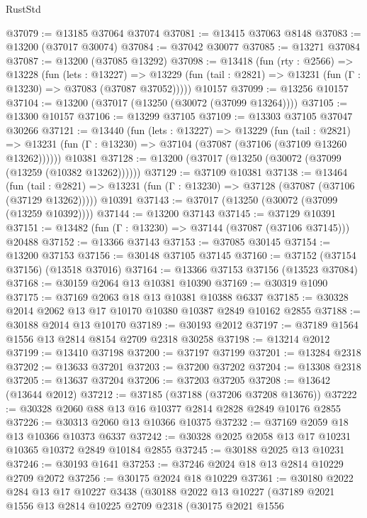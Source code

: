\begin{lexlean}{RustStd}
\begin{coremodule}
@37079 := @13185 @37064 @37074
@37081 := @13415 @37063 @8148
@37083 := @13200 (@37017 @30074)
@37084 := @37042 @30077
@37085 := @13271 @37084
@37087 := @13200 (@37085 @13292)
@37098 := @13418
    (fun (rty : @2566) =>
    @13228
      (fun (lets : @13227) =>
      @13229 (fun (tail : @2821) => @13231 (fun (Γ : @13230) => @37083 (@37087 @37052)))))
    @10157
@37099 := @13256 @10157
@37104 := @13200 (@37017 (@13250 (@30072 (@37099 @13264))))
@37105 := @13300 @10157
@37106 := @13299 @37105
@37109 := @13303 @37105 @37047 @30266
@37121 := @13440
    (fun (lets : @13227) =>
    @13229
      (fun (tail : @2821) =>
      @13231 (fun (Γ : @13230) => @37104 (@37087 (@37106 (@37109 @13260 @13262))))))
    @10381
@37128 := @13200 (@37017 (@13250 (@30072 (@37099 (@13259 (@10382 @13262))))))
@37129 := @37109 @10381
@37138 := @13464
    (fun (tail : @2821) => @13231 (fun (Γ : @13230) => @37128 (@37087 (@37106 (@37129 @13262)))))
    @10391
@37143 := @37017 (@13250 (@30072 (@37099 (@13259 @10392))))
@37144 := @13200 @37143
@37145 := @37129 @10391
@37151 := @13482 (fun (Γ : @13230) => @37144 (@37087 (@37106 @37145))) @20488
@37152 := @13366 @37143
@37153 := @37085 @30145
@37154 := @13200 @37153
@37156 := @30148 @37105 @37145
@37160 := @37152 (@37154 @37156) (@13518 @37016)
@37164 := @13366 @37153 @37156 (@13523 @37084)
@37168 := @30159 @2064 @13 @10381 @10390
@37169 := @30319 @1090
@37175 := @37169 @2063 @18 @13 @10381 @10388 @6337
@37185 := @30328 @2014 @2062 @13 @17 @10170 @10380 @10387 @2849 @10162 @2855
@37188 := @30188 @2014 @13 @10170
@37189 := @30193 @2012
@37197 := @37189 @1564 @1556 @13 @2814 @8154 @2709 @2318 @30258
@37198 := @13214 @2012
@37199 := @13410 @37198
@37200 := @37197 @37199
@37201 := @13284 @2318
@37202 := @13633 @37201
@37203 := @37200 @37202
@37204 := @13308 @2318
@37205 := @13637 @37204
@37206 := @37203 @37205
@37208 := @13642 (@13644 @2012)
@37212 := @37185 (@37188 (@37206 @37208 @13676))
@37222 := @30328 @2060 @88 @13 @16 @10377 @2814 @2828 @2849 @10176 @2855
@37226 := @30313 @2060 @13 @10366 @10375
@37232 := @37169 @2059 @18 @13 @10366 @10373 @6337
@37242 := @30328 @2025 @2058 @13 @17 @10231 @10365 @10372 @2849 @10184 @2855
@37245 := @30188 @2025 @13 @10231
@37246 := @30193 @1641
@37253 := @37246 @2024 @18 @13 @2814 @10229 @2709 @2072
@37256 := @30175 @2024 @18 @10229
@37361 := @30180
    @2022
    @284
    @13
    @17
    @10227
    @3438
    (@30188
      @2022
      @13
      @10227
      (@37189
        @2021
        @1556
        @13
        @2814
        @10225
        @2709
        @2318
        (@30175
          @2021
          @1556

\end{coremodule}
\end{lexlean}
